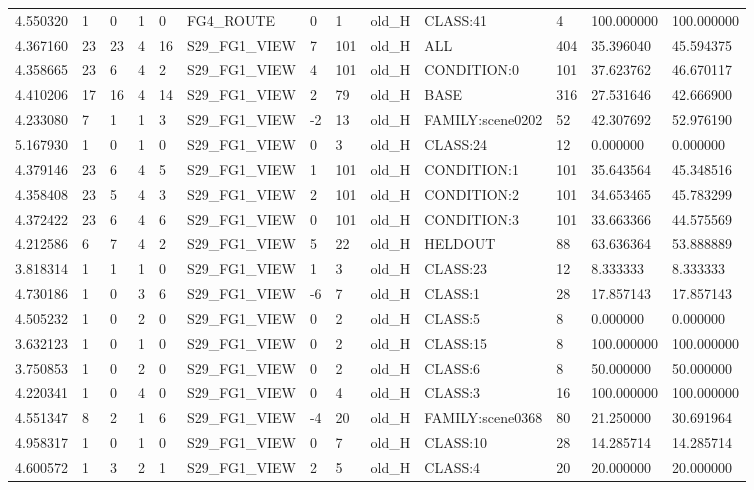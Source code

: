 \begin{tabular}{lllllllllllll}
4.550320 & 1 & 0 & 1 & 0 & FG4\_ROUTE & 0 & 1 & old\_H & CLASS:41 & 4 & 100.000000 & 100.000000 \\
4.367160 & 23 & 23 & 4 & 16 & S29\_FG1\_VIEW & 7 & 101 & old\_H & ALL & 404 & 35.396040 & 45.594375 \\
4.358665 & 23 & 6 & 4 & 2 & S29\_FG1\_VIEW & 4 & 101 & old\_H & CONDITION:0 & 101 & 37.623762 & 46.670117 \\
4.410206 & 17 & 16 & 4 & 14 & S29\_FG1\_VIEW & 2 & 79 & old\_H & BASE & 316 & 27.531646 & 42.666900 \\
4.233080 & 7 & 1 & 1 & 3 & S29\_FG1\_VIEW & -2 & 13 & old\_H & FAMILY:scene0202 & 52 & 42.307692 & 52.976190 \\
5.167930 & 1 & 0 & 1 & 0 & S29\_FG1\_VIEW & 0 & 3 & old\_H & CLASS:24 & 12 & 0.000000 & 0.000000 \\
4.379146 & 23 & 6 & 4 & 5 & S29\_FG1\_VIEW & 1 & 101 & old\_H & CONDITION:1 & 101 & 35.643564 & 45.348516 \\
4.358408 & 23 & 5 & 4 & 3 & S29\_FG1\_VIEW & 2 & 101 & old\_H & CONDITION:2 & 101 & 34.653465 & 45.783299 \\
4.372422 & 23 & 6 & 4 & 6 & S29\_FG1\_VIEW & 0 & 101 & old\_H & CONDITION:3 & 101 & 33.663366 & 44.575569 \\
4.212586 & 6 & 7 & 4 & 2 & S29\_FG1\_VIEW & 5 & 22 & old\_H & HELDOUT & 88 & 63.636364 & 53.888889 \\
3.818314 & 1 & 1 & 1 & 0 & S29\_FG1\_VIEW & 1 & 3 & old\_H & CLASS:23 & 12 & 8.333333 & 8.333333 \\
4.730186 & 1 & 0 & 3 & 6 & S29\_FG1\_VIEW & -6 & 7 & old\_H & CLASS:1 & 28 & 17.857143 & 17.857143 \\
4.505232 & 1 & 0 & 2 & 0 & S29\_FG1\_VIEW & 0 & 2 & old\_H & CLASS:5 & 8 & 0.000000 & 0.000000 \\
3.632123 & 1 & 0 & 1 & 0 & S29\_FG1\_VIEW & 0 & 2 & old\_H & CLASS:15 & 8 & 100.000000 & 100.000000 \\
3.750853 & 1 & 0 & 2 & 0 & S29\_FG1\_VIEW & 0 & 2 & old\_H & CLASS:6 & 8 & 50.000000 & 50.000000 \\
4.220341 & 1 & 0 & 4 & 0 & S29\_FG1\_VIEW & 0 & 4 & old\_H & CLASS:3 & 16 & 100.000000 & 100.000000 \\
4.551347 & 8 & 2 & 1 & 6 & S29\_FG1\_VIEW & -4 & 20 & old\_H & FAMILY:scene0368 & 80 & 21.250000 & 30.691964 \\
4.958317 & 1 & 0 & 1 & 0 & S29\_FG1\_VIEW & 0 & 7 & old\_H & CLASS:10 & 28 & 14.285714 & 14.285714 \\
4.600572 & 1 & 3 & 2 & 1 & S29\_FG1\_VIEW & 2 & 5 & old\_H & CLASS:4 & 20 & 20.000000 & 20.000000 \\

\end{tabular}

